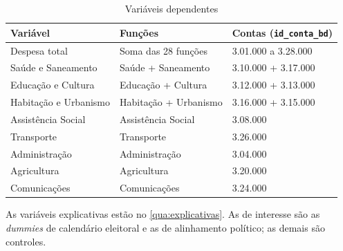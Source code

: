 \begin{table}[htbp]
\caption{Variáveis dependentes}\label{tab:dependentes}
\small
\begin{tabular}{lll}
\hline
\textbf{Variável} & \textbf{Funções} & \textbf{Contas (\texttt{id\_conta\_bd})} \\ \hline
Despesa total & Soma das 28 funções & 3.01.000 a 3.28.000 \\
Saúde e Saneamento & Saúde + Saneamento & 3.10.000 + 3.17.000 \\
Educação e Cultura & Educação + Cultura & 3.12.000 + 3.13.000 \\
Habitação e Urbanismo & Habitação + Urbanismo & 3.16.000 + 3.15.000 \\
Assistência Social & Assistência Social & 3.08.000 \\
Transporte & Transporte & 3.26.000 \\
Administração & Administração & 3.04.000 \\
Agricultura & Agricultura & 3.20.000 \\
Comunicações & Comunicações & 3.24.000 \\ \hline
\end{tabular}
\end{table}

As variáveis explicativas estão no \autoref{qua:explicativas}. As de interesse são as \textit{dummies} de calendário eleitoral e as de alinhamento político; as demais são controles.

